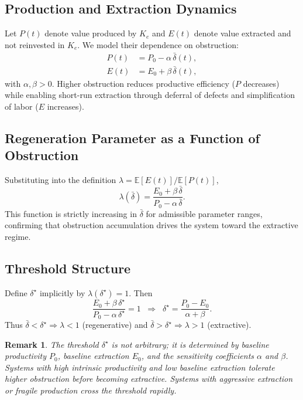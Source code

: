 \documentclass[12pt]{article}
\newtheorem{remark}{Remark}
\begin{document}
\subsection{Production and Extraction Dynamics}

Let $P(t)$ denote value produced by $K_e$ and $E(t)$ denote value extracted and not reinvested in $K_e$. We model their dependence on obstruction:
\begin{align}
P(t) &= P_0 - \alpha\,\bar{\delta}(t), \\
E(t) &= E_0 + \beta\,\bar{\delta}(t),
\end{align}
with $\alpha, \beta > 0$. Higher obstruction reduces productive efficiency ($P$ decreases) while enabling short-run extraction through deferral of defects and simplification of labor ($E$ increases).

\subsection{Regeneration Parameter as a Function of Obstruction}

Substituting into the definition $\lambda = \mathbb{E}[E(t)]/\mathbb{E}[P(t)]$,
\begin{equation}
\lambda(\bar{\delta}) = \frac{E_0 + \beta\,\bar{\delta}}{P_0 - \alpha\,\bar{\delta}}.
\end{equation}
This function is strictly increasing in $\bar{\delta}$ for admissible parameter ranges, confirming that obstruction accumulation drives the system toward the extractive regime.

\subsection{Threshold Structure}

Define $\delta^\star$ implicitly by $\lambda(\delta^\star) = 1$. Then
\begin{equation}
\frac{E_0 + \beta\,\delta^\star}{P_0 - \alpha\,\delta^\star} = 1
\;\;\Longrightarrow\;\;
\delta^\star = \frac{P_0 - E_0}{\alpha + \beta}.
\end{equation}
Thus $\bar{\delta} < \delta^\star \Rightarrow \lambda < 1$ (regenerative) and $\bar{\delta} > \delta^\star \Rightarrow \lambda > 1$ (extractive).

\begin{remark}
The threshold $\delta^\star$ is not arbitrary; it is determined by baseline productivity $P_0$, baseline extraction $E_0$, and the sensitivity coefficients $\alpha$ and $\beta$. Systems with high intrinsic productivity and low baseline extraction tolerate higher obstruction before becoming extractive. Systems with aggressive extraction or fragile production cross the threshold rapidly.
\end{remark}
\end{document}
